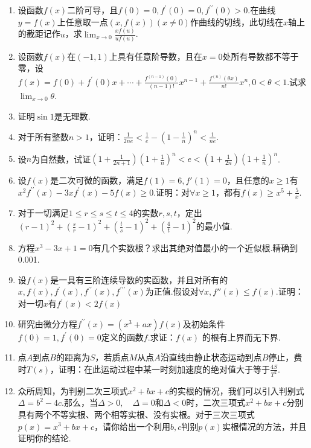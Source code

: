 \begin{enumerate}
	\item 设函数$f(x)$二阶可导，且$f ( 0 ) = 0 , f ^ { \prime } ( 0 ) = 0 , f ^ { \prime \prime } ( 0 ) > 0$.在曲线$y=f(x)$上任意取一点$(x,f(x))(x\ne 0)$作曲线的切线，此切线在$x$轴上的截距记作$u$，求$\lim_{ x \rightarrow 0 }\frac{xf(u)}{uf(u)}$.
	\item 设函数$f(x)$在$(-1,1)$上具有任意阶导数，且在$x=0$处所有导数都不等于零，设$f ( x ) = f ( 0 ) + f ^ { \prime } ( 0 ) x + \cdots + \frac { f ^ { ( n - 1 ) } ( 0 ) } { ( n - 1 ) ! } x ^ { n - 1 } + \frac { f ^ { ( n ) } ( \theta x ) } { n ! } x ^ { n } , 0 < \theta < 1$.试求$\lim_{ x \rightarrow 0 }\theta$.
	\item 证明$\sin 1$是无理数.
	\item 对于所有整数$n>1$，证明：$\frac { 1 } { 2 n e } < \frac { 1 } { e } - \left( 1 - \frac { 1 } { n } \right) ^ { n } < \frac { 1 } { n e }$.
	\item 设$n$为自然数，试证$\left( 1 + \frac { 1 } { 2 n + 1 } \right) \left( 1 + \frac { 1 } { n } \right) ^ { n } < e < \left( 1 + \frac { 1 } { 2 n } \right) \left( 1 + \frac { 1 } { n } \right) ^ { n }$.
	\item 设$f(x)$是二次可微的函数，满足$f(1)=6,f'(1)=0$，且任意的$x\geq 1$有$x ^ { 2 } f ^ { \prime \prime } ( x ) - 3 x f ^ { \prime } ( x ) - 5 f ( x ) \geqslant 0$.证明：对$\forall x\geq 1$，都有$f ( x ) \geqslant x ^ { 5 } + \frac { 5 } { x }$.
	\item 对于一切满足$1 \leqslant r \leqslant s \leqslant t \leqslant 4$的实数$r,s,t$，定出$( r - 1 ) ^ { 2 } + \left( \frac { s } { r } - 1 \right) ^ { 2 } + \left( \frac { t } { s } - 1 \right) ^ { 2 } + \left( \frac { 4 } { t } - 1 \right) ^ { 2 }$的最小值.
	\item 方程$x^{3}-3x+1=0$有几个实数根？求出其绝对值最小的一个近似根.精确到0.001.
	\item 设$f(x)$是一具有三阶连续导数的实函数，并且对所有的$x , f ( x ) , f ^ { \prime } ( x ) , f ^ { \prime \prime } ( x ) , f ^ { \prime \prime \prime } ( x )$为正值.假设对$\forall x , f '' ( x ) \leqslant f ( x )$.证明：对一切$x$有$f ^ { \prime } ( x ) < 2 f ( x )$
	\item 研究由微分方程$f ^ { \prime \prime } ( x ) = \left( x ^ { 3 } + a x \right) f ( x )$及初始条件$f ( 0 ) = 1 , f ^ { \prime } ( 0 ) = 0$定义的函数$f$.求证：$f(x)$	的根有上界而无下界.
	\item 点$A$到点$B$的距离为$S$，若质点$M$从点$A$沿直线由静止状态运动到点$B$停止，费时$T(s)$，证明：在此运动过程中某一时刻加速度的绝对值大于等于$\frac{4S}{T^{2}}$.
	\item 众所周知，为判别二次三项式$x ^ { 2 } + b x + c$的实根的情况，我们可以引入判别式$\Delta = b ^ { 2 } - 4 c$.那么，当$\Delta > 0 , \quad \Delta = 0$和$\Delta < 0$时，二次三项式$x ^ { 2 } + b x + c$分别具有两个不等实根、两个相等实根、没有实根。对于三次三项式$p ( x ) = x ^ { 3 } + b x + c$，请你给出一个利用$b,c$判别$p(x)$实根情况的方法，并且证明你的结论.
	
\end{enumerate}